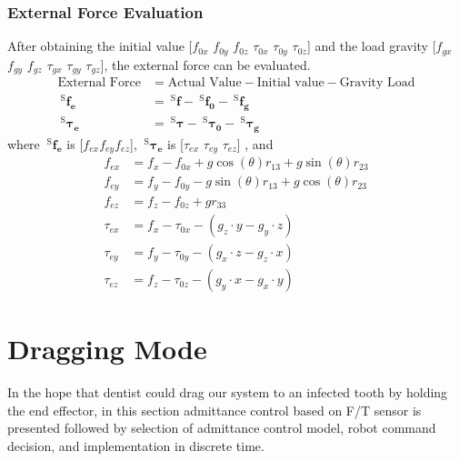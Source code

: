 \subsubsection{External Force Evaluation}
\hspace{6mm}After obtaining the initial value [$f_{0x}$ $f_{0y}$ $f_{0z}$ $\tau_{0x}$ $\tau_{0y}$ $\tau_{0z}$] and the load gravity [$f_{gx}$ $f_{gy}$ $f_{gz}$ $\tau_{gx}$ $\tau_{gy}$ $\tau_{gz}$], the external force can be evaluated.
\begin{equation}
\begin{split}
\text{External Force}	&= \text{Actual Value} 	-\text{Initial value}	-\text{Gravity Load}\\
\ ^\mathrm{S}\!\boldsymbol{f_e}		&= \ ^\mathrm{S}\!\boldsymbol{f}		-\ ^\mathrm{S}\!\boldsymbol{f_0}		-\ ^\mathrm{S}\!\boldsymbol{f_g}\\ 
\ ^\mathrm{S}\boldsymbol{\tau_e}		&= \ ^\mathrm{S}\boldsymbol{\tau}	-\ ^\mathrm{S}\boldsymbol{\tau_0}	-\ ^\mathrm{S}\boldsymbol{\tau_g}		
\end{split}
\end{equation}
where $\ ^\mathrm{S}\!\boldsymbol{f_e}$ is [$f_{ex} f_{ey} f_{ez}$], $\ ^\mathrm{S}\boldsymbol{\tau_e}$ is [$\tau_{ex}$ $\tau_{ey}$ $\tau_{ez}$] , and 
\begin{equation}
\begin{split}
f_{ex} &= f_x - f_{0x} 	+ g\cos(\theta)r_{13} 	+ g\sin(\theta)r_{23}\\
f_{ey} &= f_y - f_{0y} 	- g\sin(\theta)r_{13} 	+ g\cos(\theta)r_{23}\\
f_{ez} &= f_z - f_{0z} 	+ gr_{33}\\
\tau_{ex} &= f_x - \tau_{0x} - \left( g_z\cdot y - g_y\cdot z \right)\\
\tau_{ey} &= f_y - \tau_{0y} - \left( g_x\cdot z - g_z\cdot x \right)\\
\tau_{ez} &= f_z - \tau_{0z} - \left( g_y\cdot x - g_x\cdot y \right)
\end{split}
\end{equation}
\section{Dragging Mode}
\hspace*{6mm}In the hope that dentist could drag our system to an infected tooth by holding the end effector, in this section admittance control based on F/T sensor is presented followed by selection of admittance control model, robot command decision, and implementation in discrete time.
